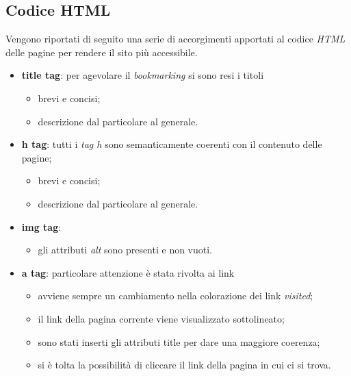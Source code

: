 \documentclass[12pt]{article}
\begin{document}
\subsection{Codice HTML}
Vengono riportati di seguito una serie di accorgimenti apportati al codice \emph{HTML} delle pagine per rendere il sito pi\`u accessibile.
\begin{itemize}
	\item \textbf{title tag}: per agevolare il \emph{bookmarking} si sono resi i titoli
	\begin{itemize}
		\item brevi e concisi;
		\item descrizione dal particolare al generale.
	\end{itemize}
\end{itemize}
\begin{itemize}
	\item \textbf{h tag}: tutti i \emph{tag h} sono semanticamente coerenti con il contenuto delle pagine;
	\begin{itemize}
		\item brevi e concisi;
		\item descrizione dal particolare al generale.
	\end{itemize}
\end{itemize}
\begin{itemize}
	\item \textbf{img tag}:
	\begin{itemize}
		\item gli attributi \emph{alt} sono presenti e non vuoti.
	\end{itemize}
\end{itemize}
\begin{itemize}
	\item \textbf{a tag}: particolare attenzione \`e stata rivolta ai link
	\begin{itemize}
		\item avviene sempre un cambiamento nella colorazione dei link \emph{visited};
		\item il link della pagina corrente viene visualizzato sottolineato;
		\item sono stati inserti gli attributi title per dare una maggiore coerenza;
		\item si \`e tolta la possibilit\`a di cliccare il link della pagina in cui ci si trova.
	\end{itemize}
\end{itemize}
\end{document}
